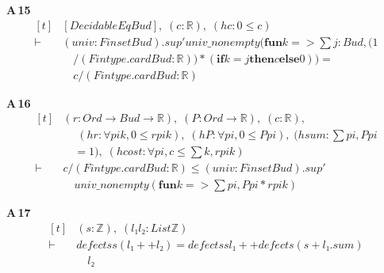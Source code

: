 \noindent\textbf{A\,15}\quad{}
{\footnotesize\[ \begin{aligned}[t]
&[\mathit{DecidableEq} \mathit{Bud}],\; (\mathit{c} : \mathbb{R} ),\; (\mathit{hc} : 0 \leq \mathit{c})\\
\vdash\;&(\mathit{univ} : \mathit{Finset} \mathit{Bud}).\mathit{sup'} \mathit{univ\_nonempty} (\mathbf{fun} \mathit{k} => \textstyle\sum \mathit{j} : \mathit{Bud}, (1\\
&\quad / (\mathit{Fintype}.\mathit{card} \mathit{Bud} : \mathbb{R} )) * (\mathbf{if} \mathit{k} = \mathit{j} \mathbf{then} \mathit{c} \mathbf{else} 0)) =\\
&\quad \mathit{c} / (\mathit{Fintype}.\mathit{card} \mathit{Bud} : \mathbb{R} )
\end{aligned} \]}

\noindent\textbf{A\,16}\quad{}
{\footnotesize\[ \begin{aligned}[t]
&(\mathit{r} : \mathit{Ord} \to \mathit{Bud} \to \mathbb{R} ),\; (\mathit{P} : \mathit{Ord} \to \mathbb{R} ),\; (\mathit{c} : \mathbb{R} ),\\
&\quad \; (\mathit{hr} : \forall \mathit{pi} \mathit{k}, 0 \leq \mathit{r} \mathit{pi} \mathit{k}),\; (\mathit{hP} : \forall \mathit{pi}, 0 \leq \mathit{P} \mathit{pi}),\; (\mathit{hsum} : \textstyle\sum \mathit{pi}, \mathit{P} \mathit{pi}\\
&\quad = 1),\; (\mathit{hcost} : \forall \mathit{pi}, \mathit{c} \leq \textstyle\sum \mathit{k}, \mathit{r} \mathit{pi} \mathit{k})\\
\vdash\;&\mathit{c} / (\mathit{Fintype}.\mathit{card} \mathit{Bud} : \mathbb{R} ) \leq (\mathit{univ} : \mathit{Finset} \mathit{Bud}).\mathit{sup'}\\
&\quad \mathit{univ\_nonempty} (\mathbf{fun} \mathit{k} => \textstyle\sum \mathit{pi}, \mathit{P} \mathit{pi} * \mathit{r} \mathit{pi} \mathit{k})
\end{aligned} \]}

\noindent\textbf{A\,17}\quad{}
{\footnotesize\[ \begin{aligned}[t]
&(\mathit{s} : \mathbb{Z} ),\; (\mathit{l₁} \mathit{l₂} : \mathit{List} \mathbb{Z} )\\
\vdash\;&\mathit{defects} \mathit{s} (\mathit{l₁} ++ \mathit{l₂}) = \mathit{defects} \mathit{s} \mathit{l₁} ++ \mathit{defects} (\mathit{s} + \mathit{l₁}.\mathit{sum})\\
&\quad \mathit{l₂}
\end{aligned} \]}

